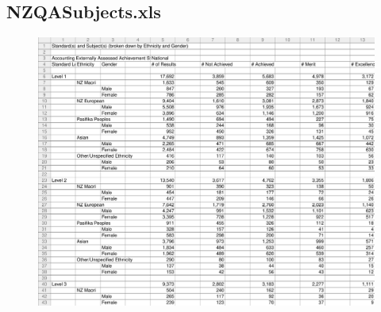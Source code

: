 \documentclass[a4paper]{article}
\begin{document}
\subsection{NZQASubjects.xls}
\label{sec:TCRO_NZQASubjects.xls}
\begin{figure}[!h]
\centering
\includegraphics[width=\textwidth]{./TestCase/NZQASubjects.pdf}
\end{figure}
\end{document}
